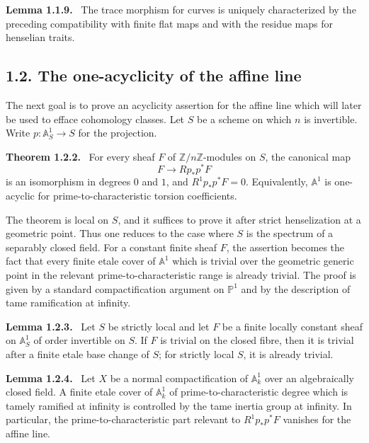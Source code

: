 \documentclass[12pt]{article}
\newcommand{\Zz}{\mathbb Z}
\newenvironment{statement}[1]{\par\medskip\noindent\textbf{#1.}\ }{\par\medskip}
\begin{document}
\begin{statement}{Lemma 1.1.9}
The trace morphism for curves is uniquely characterized by the preceding compatibility with finite flat maps and with the residue maps for henselian traits.
\end{statement}

\subsection*{1.2. The one-acyclicity of the affine line}

The next goal is to prove an acyclicity assertion for the affine line which will later be used to efface cohomology classes. Let \(S\) be a scheme on which \(n\) is invertible. Write \(p:\mathbb A^1_S\to S\) for the projection.

\begin{statement}{Theorem 1.2.2}
For every sheaf \(F\) of \(\Zz/n\Zz\)-modules on \(S\), the canonical map
\[
F\longrightarrow Rp_*p^*F
\]
is an isomorphism in degrees \(0\) and \(1\), and \(R^1p_*p^*F=0\). Equivalently, \(\mathbb A^1\) is one-acyclic for prime-to-characteristic torsion coefficients.
\end{statement}

The theorem is local on \(S\), and it suffices to prove it after strict henselization at a geometric point. Thus one reduces to the case where \(S\) is the spectrum of a separably closed field. For a constant finite sheaf \(F\), the assertion becomes the fact that every finite etale cover of \(\mathbb A^1\) which is trivial over the geometric generic point in the relevant prime-to-characteristic range is already trivial. The proof is given by a standard compactification argument on \(\mathbb P^1\) and by the description of tame ramification at infinity.

\begin{statement}{Lemma 1.2.3}
Let \(S\) be strictly local and let \(F\) be a finite locally constant sheaf on \(\mathbb A^1_S\) of order invertible on \(S\). If \(F\) is trivial on the closed fibre, then it is trivial after a finite etale base change of \(S\); for strictly local \(S\), it is already trivial.
\end{statement}

\begin{statement}{Lemma 1.2.4}
Let \(X\) be a normal compactification of \(\mathbb A^1_k\) over an algebraically closed field. A finite etale cover of \(\mathbb A^1_k\) of prime-to-characteristic degree which is tamely ramified at infinity is controlled by the tame inertia group at infinity. In particular, the prime-to-characteristic part relevant to \(R^1p_*p^*F\) vanishes for the affine line.
\end{statement}
\end{document}
